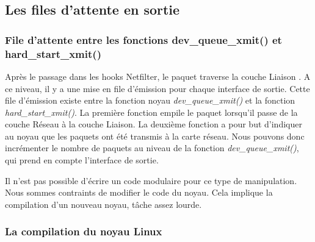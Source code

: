 \documentclass[a4paper]{article}
\begin{document}
\subsection{Les files d'attente en sortie}

\subsubsection{File d'attente entre les fonctions dev\_queue\_xmit() et hard\_start\_xmit()}

Après le passage dans les hooks Netfilter, le paquet traverse la couche Liaison \cite{intel} \cite{stack}. A ce niveau, il y a une mise en file d’émission pour chaque interface de sortie. Cette file d’émission existe entre la fonction noyau \textit{dev\_queue\_xmit()} et la fonction \textit{hard\_start\_xmit()}. La première fonction empile le paquet lorsqu’il passe de la couche Réseau à la couche Liaison. La deuxième fonction a pour but d’indiquer au noyau que les paquets ont été transmis à la carte réseau. Nous pouvons donc incrémenter le nombre de paquets au niveau de la fonction \textit{dev\_queue\_xmit()}, qui prend en compte l’interface de sortie.

Il n’est pas possible d’écrire un code modulaire pour ce type de manipulation. Nous sommes contraints de modifier le code du noyau. Cela implique la compilation d’un nouveau noyau, tâche assez lourde. 

\subsubsection{La compilation du noyau Linux}
\end{document}
